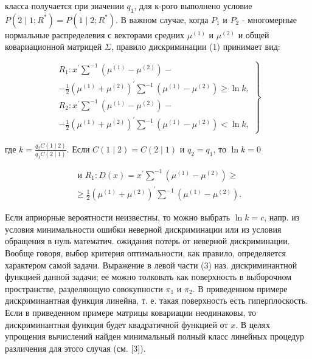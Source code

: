 \documentclass[10pt]{article}
\begin{document}
класса получается при значении $q_{1}$, для к-рого выполнено условие $P\left(2 \mid 1 ; R^{*}\right)=P\left(1 \mid 2 ; R^{*}\right)$. В важном случае, когда $P_{1}$ и $P_{2}$ - многомерные нормальные распределевия с векторами средних $\mu^{(1)}$ и $\mu^{(2)}$ и общей ковариационной матрицей $\Sigma$, правило дискриминации (1) принимает вид:



\[

\left.\begin{array}{c}

R_{1}: x^{\prime} \sum^{-1}\left(\mu^{(1)}-\mu^{(2)}\right)- \\

-\frac{1}{2}\left(\mu^{(1)}+\mu^{(2)}\right)^{\prime} \sum^{-1}\left(\mu^{(1)}-\mu^{(2)}\right) \geqslant \ln k, \\

R_{2}: x^{\prime} \sum^{-1}\left(\mu^{(1)}-\mu^{(2)}\right)- \\

-\frac{1}{2}\left(\mu^{(1)}+\mu^{(2)}\right)^{\prime} \sum^{-1}\left(\mu^{(1)}-\mu^{(2)}\right)<\ln k,

\end{array}\right\}

\]



где $k=\frac{q_{2} C(1 \mid 2)}{q_{1} C(2 \mid 1)}$. Если $C(1 \mid 2)=C(2 \mid 1)$ и $q_{2}=q_{1}$, то $\ln k=0$



\[

\begin{gathered}

\text { и } R_{1}: D(x)=x^{\prime} \sum^{-1}\left(\mu^{(1)}-\mu^{(2)}\right) \geqslant \\

\geqslant \frac{1}{2}\left(\mu^{(1)}+\mu^{(2)}\right)^{\prime} \sum^{-1}\left(\mu^{(1)}-\mu^{(2)}\right) .

\end{gathered}

\]



Если априорные вероятности неизвестны, то можно выбрать $\ln k=c$, напр. из условия минимальности ошибки неверной дискриминации или из условия обращения в нуль математич. ожидания потерь от неверной дискриминации. Вообще говоря, выбор критерия оптимальности, как правило, определяется характером самой задачи. Выражение в левой части (3) наз. дискриминантной функцией данной задачи; ее можно толковать как поверхность в выборочном пространстве, разделяющую совокупности $\pi_{1}$ и $\pi_{2}$. В приведенном примере дискриминантная функция линейна, т. е. такая поверхность есть гиперплоскость. Если в приведенном примере матрицы ковариации неодинаковы, то дискриминантная функция будет квадратичной функцией от $x$. В целях упрощения вычислений найден минимальный полный класс линейных процедур различения для этого случая (см. [3]).
\end{document}
